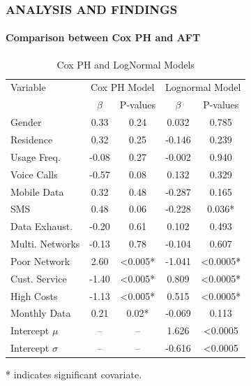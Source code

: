 \documentclass[12pt]{beamer}
\begin{document}
	\begin{frame}
    \frametitle{ANALYSIS AND FINDINGS}
        \framesubtitle{Comparison between Cox PH and AFT}  

    \begin{table}[H]
    \centering
    \scriptsize
    \setlength{\tabcolsep}{3pt} %
    \begin{tabular}{lcc|cc}
    \toprule
    Variable & \multicolumn{2}{c}{Cox PH Model} & \multicolumn{2}{c}{Lognormal Model} \\
    \cmidrule(lr){2-3} \cmidrule(lr){4-5}
     &   \scriptsize{$\beta$}& \scriptsize{P-values}& \scriptsize{$\beta$}& \scriptsize{P-values}\\
    \midrule
    Gender & 0.33 & 0.24 & 0.032 & 0.785 \\
    Residence & 0.32 & 0.25 & -0.146 & 0.239 \\
    Usage Freq. & -0.08 & 0.27 & -0.002 & 0.940 \\
    Voice Calls & -0.57 & 0.08 & 0.132 & 0.329 \\
    Mobile Data & 0.32 & 0.48 & -0.287 & 0.165 \\
    SMS & 0.48 & 0.06 & -0.228 & 0.036*\\
    Data Exhaust. & -0.20 & 0.61 & 0.102 & 0.493 \\
    Multi. Networks & -0.13 & 0.78 & -0.104 & 0.607 \\
    Poor Network & 2.60 & <0.005* & -1.041 & <0.0005*\\
    Cust. Service & -1.40 & <0.005* & 0.809 & <0.0005*\\
    High Costs & -1.13 & <0.005* & 0.515 & <0.0005*\\
    Monthly Data & 0.21 & 0.02* & -0.069 & 0.113 \\
    \midrule
    Intercept $\mu$ & -- & -- & 1.626 & <0.0005 \\
    Intercept $\sigma$ & -- & -- & -0.616 & <0.0005 \\
    \bottomrule
    \end{tabular}
    \scriptsize{\caption{Cox PH and LogNormal Models}}
    
    \label{tab:combined_model_results}
    \end{table}
    \scriptsize{* indicates significant covariate.}
    \end{frame}
\end{document}
